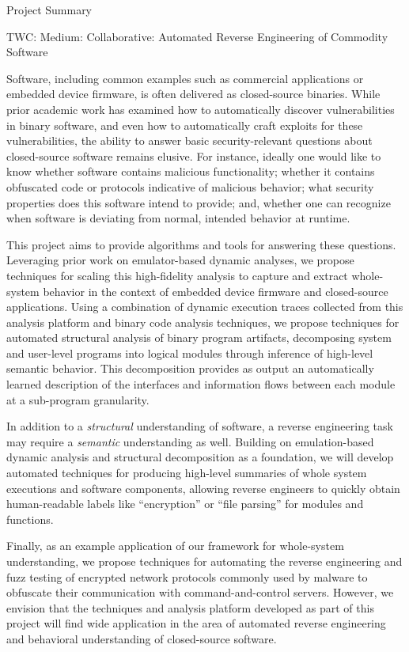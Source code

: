 \documentclass[letterpaper,twoside,11pt,headings=small]{scrartcl}
\newcommand{\basetitle}{TWC: Medium: Collaborative: Automated Reverse Engineering of Commodity Software}
\newcommand{\thetitle}{\basetitle\xspace}
\begin{document}

{\sffamily\bfseries
\begin{center}
\fontsize{16}{16}\selectfont Project Summary

\fontsize{13}{13}\selectfont \thetitle
\end{center}
\label{sec:summary}
}

Software, including common examples such as commercial applications or
embedded device firmware, is often delivered as closed-source binaries.  While
prior academic work has examined how to automatically discover vulnerabilities
in binary software, and even how to automatically craft exploits for these
vulnerabilities, the ability to answer basic security-relevant questions about
closed-source software remains elusive.  For instance, ideally one would like
to know whether software contains malicious functionality; whether it contains
obfuscated code or protocols indicative of malicious behavior; what security
properties does this software intend to provide; and, whether one can
recognize when software is deviating from normal, intended behavior at
runtime.

This project aims to provide algorithms and tools for answering these
questions. Leveraging prior work on emulator-based dynamic analyses, we
propose techniques for scaling this high-fidelity analysis to capture and
extract whole-system behavior in the context of embedded device firmware and
closed-source applications.  Using a combination of dynamic execution traces
collected from this analysis platform and binary code analysis techniques, we
propose techniques for automated structural analysis of binary program
artifacts, decomposing system and user-level programs into logical modules
through inference of high-level semantic behavior.  This decomposition
provides as output an automatically learned description of the interfaces and
information flows between each module at a sub-program granularity.

In addition to a \emph{structural} understanding of software, a reverse
engineering task may require a \emph{semantic} understanding as well. Building
on emulation-based dynamic analysis and structural decomposition as a
foundation, we will develop automated techniques for producing high-level
summaries of whole system executions and software components, allowing reverse
engineers to quickly obtain human-readable labels like ``encryption'' or ``file
parsing'' for modules and functions.

Finally, as an example application of our framework for whole-system
understanding, we propose techniques for automating the reverse engineering
and fuzz testing of encrypted network protocols commonly used by malware to
obfuscate their communication with command-and-control servers.  However, we
envision that the techniques and analysis platform developed as part of this
project will find wide application in the area of automated reverse
engineering and behavioral understanding of closed-source software.
\end{document}
